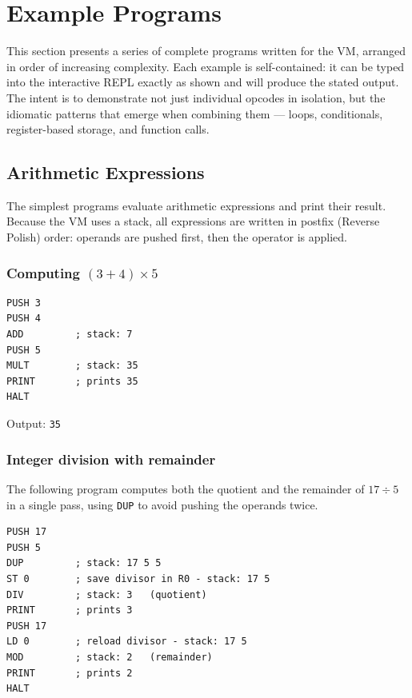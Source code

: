 \section{Example Programs}

This section presents a series of complete programs written for the VM, arranged in order of increasing complexity. Each example is self-contained: it can be typed into the interactive REPL exactly as shown and will produce the stated output. The intent is to demonstrate not just individual opcodes in isolation, but the idiomatic patterns that emerge when combining them — loops, conditionals, register-based storage, and function calls.

\subsection{Arithmetic Expressions}

The simplest programs evaluate arithmetic expressions and print their result. Because the VM uses a stack, all expressions are written in postfix (Reverse Polish) order: operands are pushed first, then the operator is applied.

\subsubsection*{Computing $(3 + 4) \times 5$}

\begin{lstlisting}
PUSH 3
PUSH 4
ADD         ; stack: 7
PUSH 5
MULT        ; stack: 35
PRINT       ; prints 35
HALT
\end{lstlisting}

Output: \texttt{35}

\subsubsection*{Integer division with remainder}

The following program computes both the quotient and the remainder of $17 \div 5$ in a single pass, using \texttt{DUP} to avoid pushing the operands twice.

\begin{lstlisting}
PUSH 17
PUSH 5
DUP         ; stack: 17 5 5
ST 0        ; save divisor in R0 - stack: 17 5
DIV         ; stack: 3   (quotient)
PRINT       ; prints 3
PUSH 17
LD 0        ; reload divisor - stack: 17 5
MOD         ; stack: 2   (remainder)
PRINT       ; prints 2
HALT
\end{lstlisting}

